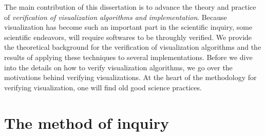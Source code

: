 The main contribution of this dissertation is to advance the theory and practice of \emph{verification of visualization algorithms and implementation}.  Because visualization has become such an important part in the scientific inquiry, some scientific endeavors, will require softwares to be throughly verified.
%
We provide the theoretical background for the verification of visualization algorithms and the results of applying these techniques to several implementations. 
%
Before we dive into the details on how to verify visualization algorithms, we go over the motivations behind verifying visualizations. 
%
At the heart of the methodology for verifying visualization, one will find old good science practices. 
%
	
\section{The method of inquiry}

